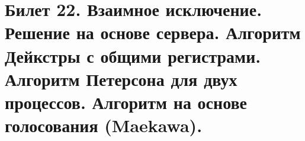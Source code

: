 \newpage
\section {Билет 22. Взаимное исключение. Решение на основе сервера. Алгоритм Дейкстры с общими регистрами. Алгоритм Петерсона для двух процессов. Алгоритм на основе голосования (Maekawa).}